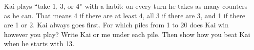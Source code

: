 \documentclass[12pt]{article}
\begin{document}
\newpage
{}Kai plays “take 1, 3, or 4” with a habit: on every turn he takes as many counters as he can. That means 4 if there are at least 4, all 3 if there are 3, and 1 if there are 1 or 2. Kai always goes first. For which piles from 1 to 20 does Kai win however you play? Write Kai or me under each pile. Then show how you beat Kai when he starts with 13.

\vspace{0.4cm}
\end{document}
